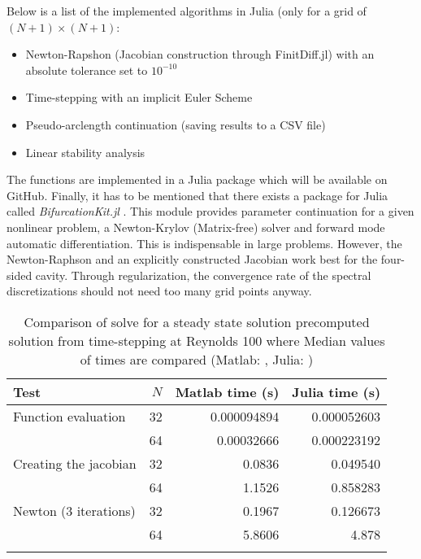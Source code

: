 Below is a list of the implemented algorithms in Julia (only for a grid of
$(N+1) \times (N+1)$:

\begin{itemize}
  \item Newton-Rapshon (Jacobian construction through FinitDiff.jl) with an absolute tolerance
    set to $10^{-10}$
  \item Time-stepping with an implicit Euler Scheme
  \item Pseudo-arclength continuation (saving results to a CSV file)
  \item Linear stability analysis
\end{itemize}

The functions are implemented in a Julia package which will be available on
GitHub. Finally, it has to be mentioned that there exists a package for Julia
called \emph{BifurcationKit.jl} \citep{veltz2020}. This module provides
parameter continuation for a given nonlinear problem, a Newton-Krylov
(Matrix-free) solver and forward mode automatic differentiation. This is
indispensable in large problems. However, the Newton-Raphson and an explicitly
constructed Jacobian work best for the four-sided cavity. Through
regularization, the convergence rate of the spectral discretizations should not
need too many grid points anyway.

\begin{table}[ht]
  \caption{Comparison of solve for a steady state solution precomputed solution 
    from time-stepping at Reynolds 100 where Median values of times are compared
  (Matlab: , Julia: )}
  \label{tab:matlab_julia}
\begin{tabular}{lrrr}
Test & $N$ & Matlab time (s) & Julia time (s) \\
\hline
Function evaluation  & 32 & 0.000094894  & 0.000052603 \\
& 64 & 0.00032666 & 0.000223192 \\
 Creating the jacobian  & 32 & 0.0836  &  0.049540  \\
& 64 & 1.1526 & 0.858283 \\
Newton (3 iterations)  & 32 & 0.1967  & 0.126673 \\
& 64 & 5.8606  & 4.878 \\
\label{tab:comp}
\end{tabular}
\end{table}

